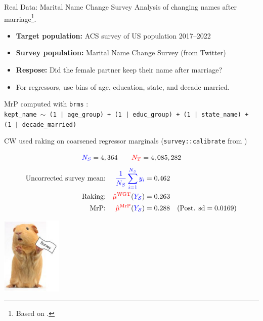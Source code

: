 



\begin{frame}{Real Data: Marital Name Change Survey}
Analysis of changing names after marriage\footnote{
    Based on \textcite{alexander:2019:namechange,cohen:2019:namechange,ipumsusa}.}.

\begin{itemize}
    \item \textbf{Target population:} ACS survey of US population 2017--2022
    \item \textbf{Survey population:} Marital Name Change Survey (from Twitter)
    \item \textbf{Respose:}  Did the female partner keep their name after marriage?
    \item For regressors, use bins of age, education, state, and decade married.
\end{itemize}

{
MrP computed with \texttt{brms} \parencite{brms}:\\
\tiny
\texttt{kept\_name $\sim$ (1 | age\_group) + (1 | educ\_group) + (1 | state\_name) + (1 | decade\_married)}
}

CW used raking on coarsened regressor marginals ({\small{\texttt{survey::calibrate}}} from \textcite{lumley:2025:survey})

\begin{minipage}{0.8\textwidth}
$$
\textcolor{blue}{{\textcolor{blue}{N_S}}} ={}4,364 \quad\quad \textcolor{red}{{\textcolor{red}{N_T}}} ={} 4,085,282
$$
$$
\begin{aligned}
    \textrm{Uncorrected survey mean:} && \textcolor{blue}{\frac{1}{{\textcolor{blue}{N_S}}} \sum_{i=1}^{\textcolor{blue}{N_S}} y_i} ={}& 0.462 \\
    \textrm{Raking:} && \textcolor{red}{\hat{\mu}^{\mathrm{WGT}}}(\textcolor{blue}{\textcolor{blue}{Y_{\mathcal{S}}}}) ={}& 0.263 \\
    \textrm{MrP:} && \textcolor{red}{\hat{\mu}^{\mathrm{MrP}}}(\textcolor{blue}{\textcolor{blue}{Y_{\mathcal{S}}}}) ={}& 0.288
        \quad(\textrm{Post. sd} = 0.0169)\\
\end{aligned}
$$
\end{minipage}
%
\hfill
%
\begin{minipage}{0.15\textwidth} %
\pause
\includegraphics[height=10em]{static_figures/guinea_pig.png}
\end{minipage}
\vspace{1em}
%
\end{frame}


